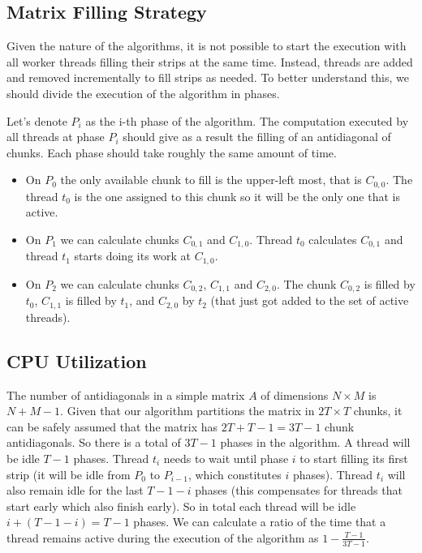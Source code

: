\documentclass[journal]{IEEEtran}
\begin{document}
\subsection{Matrix Filling Strategy}

Given the nature of the algorithms, it is not possible to start the execution with all worker threads filling their strips at the same time. Instead, threads are added and removed incrementally to fill strips as needed. To better understand this, we should divide the execution of the algorithm in phases.

Let's denote $P_i$ as the i-th phase of the algorithm. The computation executed by all threads at phase $P_i$ should give as a result the filling of an antidiagonal of chunks. Each phase should take roughly the same amount of time.

\begin{itemize}
    \item On $P_0$ the only available chunk to fill is the upper-left most, that is $C_{0,0}$. The thread $t_0$ is the one assigned to this chunk so it will be the only one that is active.
    \item On $P_1$ we can calculate chunks $C_{0,1}$ and $C_{1, 0}$. Thread $t_0$ calculates $C_{0,1}$ and thread $t_1$ starts doing its work at $C_{1, 0}$.
    \item On $P_2$ we can calculate chunks $C_{0, 2}$, $C_{1,1}$ and $C_{2,0}$. The chunk $C_{0, 2}$ is filled by $t_0$, $C_{1,1}$ is filled by $t_1$, and $C_{2,0}$ by $t_2$ (that just got added to the set of active threads).
\end{itemize}

\subsection{CPU Utilization}

The number of antidiagonals in a simple matrix $A$ of dimensions $N \times M$ is $N + M - 1$. Given that our algorithm partitions the matrix in $2T \times T$ chunks, it can be safely assumed that the matrix has $2T + T - 1 = 3T - 1$ chunk antidiagonals. So there is a total of $3T - 1$ phases in the algorithm.  
A thread will be idle $T - 1$ phases. Thread $t_i$ needs to wait until phase $i$ to start filling its first strip (it will be idle from $P_0$ to $P_{i-1}$, which constitutes $i$ phases). Thread $t_i$ will also remain idle for the last $T - 1 - i$ phases (this compensates for threads that start early which also finish early). So in total each thread will be idle $i + (T - 1 - i) = T - 1$ phases. We can calculate a ratio of the time that a thread remains active during the execution of the algorithm as $1 - \frac{T-1}{3T-1}$.
\end{document}
